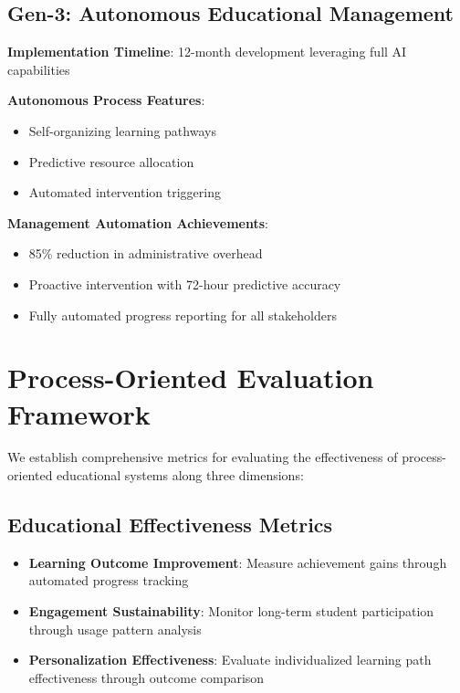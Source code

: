 \documentclass[conference]{IEEEtran}
\begin{document}
\subsection{Gen-3: Autonomous Educational Management}

\textbf{Implementation Timeline}: 12-month development leveraging full AI capabilities

\textbf{Autonomous Process Features}:
\begin{itemize}
    \item Self-organizing learning pathways
    \item Predictive resource allocation
    \item Automated intervention triggering
\end{itemize}

\textbf{Management Automation Achievements}:
\begin{itemize}
    \item 85\% reduction in administrative overhead
    \item Proactive intervention with 72-hour predictive accuracy  
    \item Fully automated progress reporting for all stakeholders
\end{itemize}

\section{Process-Oriented Evaluation Framework}

We establish comprehensive metrics for evaluating the effectiveness of process-oriented educational systems along three dimensions:

\subsection{Educational Effectiveness Metrics}

\begin{itemize}
    \item \textbf{Learning Outcome Improvement}: Measure achievement gains through automated progress tracking
    \item \textbf{Engagement Sustainability}: Monitor long-term student participation through usage pattern analysis
    \item \textbf{Personalization Effectiveness}: Evaluate individualized learning path effectiveness through outcome comparison
\end{itemize}
\end{document}
